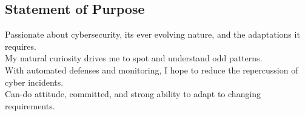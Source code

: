 \documentclass[mm, 11pt]{simple_style}
\begin{document}
\begin{resume}
\section{Statement of Purpose}

Passionate about cybersecurity, its ever evolving nature, and the adaptations it requires.\\
My natural curiosity drives me to spot and understand odd patterns.\\
With automated defenses and monitoring, I hope to reduce the repercussion of cyber incidents.\\
Can-do attitude, committed, and strong ability to adapt to changing requirements.\\
%
\sectionline


\end{resume}
\end{document}

